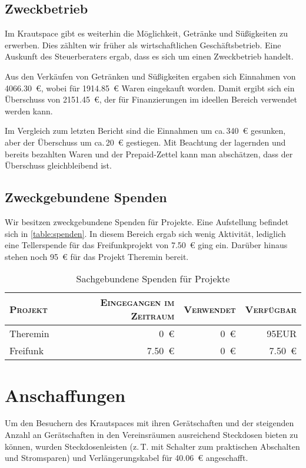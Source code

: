 \documentclass[ngerman]{scrartcl}
\begin{document}
\subsection{Zweckbetrieb}
\label{sec:Zweckbetrieb}
Im Krautspace gibt es weiterhin die Möglichkeit, Getränke und Süßigkeiten zu erwerben.
Dies zählten wir früher als wirtschaftlichen Geschäftsbetrieb. Eine Auskunft des Steuerberaters ergab, dass es sich um einen Zweckbetrieb handelt.

Aus den Verkäufen  von Getränken und Süßigkeiten ergaben sich Einnahmen von \num{4066,30}~\euro{}, wobei für \num{1914,85}~\euro{} Waren eingekauft worden.
Damit ergibt sich ein Überschuss von \num{2151,45}~\euro{}, der für Finanzierungen im ideellen Bereich verwendet werden kann.

Im Vergleich zum letzten Bericht sind die Einnahmen um ca.\,\num{340}~\euro{} gesunken, aber der Überschuss um ca.\,\num{20}~\euro{} gestiegen.
Mit Beachtung der lagernden und bereits bezahlten Waren und der Prepaid-Zettel kann man abschätzen, dass der Überschuss gleichbleibend ist.

\subsection{Zweckgebundene Spenden}
\label{sec:zweckgebundene_spenden}

Wir besitzen zweckgebundene Spenden für Projekte. Eine Aufstellung befindet sich in \autoref{table:spenden}.
In diesem Bereich ergab sich wenig Aktivität, lediglich eine Tellerspende für das Freifunkprojekt von \num{7,50}~\euro{} ging ein. Darüber hinaus stehen noch \num{95}~\euro{} für das Projekt Theremin bereit.

\begin{table}[h]
	\centering
	\begin{tabular}{l|r|r|r}
          \toprule
	\textsc{Projekt} & \textsc{Eingegangen im Zeitraum} & \textsc{Verwendet} & \textsc{Verfügbar} \\ \midrule
	Theremin & \num{0}~\euro{} & \num{0}~\euro{} & \num{95}{EUR} \\
	Freifunk & \num{7,50}~\euro{} & \num{0}~\euro{} & \num{7,50}~\euro{} \\
\bottomrule
	\end{tabular}
	\caption{Sachgebundene Spenden für Projekte}
	\label{table:spenden}
\end{table}

\section{Anschaffungen}
\label{sec:anschaffungen}
Um den Besuchern des Krautspaces mit ihren Gerätschaften und der steigenden Anzahl an Gerätschaften in den Vereinsräumen ausreichend Steckdosen bieten zu können, wurden Steckdosenleisten (z.\,T. mit Schalter zum praktischen Abschalten und Stromsparen) und Verlängerungskabel für \num{40,06}~\euro{} angeschafft.
\end{document}
